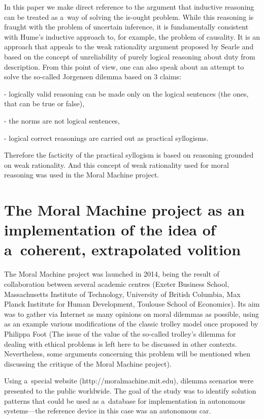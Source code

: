 In this paper we make direct reference to the argument that inductive reasoning can be treated as a~way of solving the is-ought problem. While this reasoning is fraught with the problem of uncertain inference, it is fundamentally consistent with Hume's inductive approach to, for example, the problem of causality. It is an approach that appeals to the weak rationality argument proposed by Searle
\parencite*[][]{searle_how_1964} %
 and based on the concept of unreliability of purely logical reasoning about duty from description. From this point of view, one can also speak about an attempt to solve the so-called Jorgensen dilemma 
\parencite[][]{jorgensen_imperatives_1937} %
 based on 3 claims:

{}- logically valid reasoning can be made only on the logical sentences (the ones, that can be true or false),

{}- the norms are not logical sentences,

{}- logical correct reasonings are carried out as practical syllogisms.

Therefore the facticity of the practical syllogism is based on reasoning grounded on weak rationality. And this concept of weak rationality used for moral reasoning was used in the Moral Machine project.

\section*{The Moral Machine project as an implementation of the idea of a~coherent, extrapolated volition}
The Moral Machine project was launched in 2014, being the result of collaboration between several academic centres (Exeter Business School, Massachusetts Institute of Technology, University of British Columbia, Max Planck Institute for Human Development, Toulouse School of Economics). Its aim was to gather via Internet as many opinions on moral dilemmas as possible, using as an example various modifications of the classic trolley model once proposed by Philippa Foot (The issue of the value of the so-called trolley's dilemma for dealing with ethical problems is left here to be discussed in other contexts. Nevertheless, some arguments concerning this problem will be mentioned when discussing the critique of the Moral Machine project).

Using a~special website (http://moralmachine.mit.edu), dilemma scenarios were presented to the public worldwide. The goal of the study was to identify solution patterns that could be used as a~database for implementation in autonomous systems—the reference device in this case was an autonomous car.

